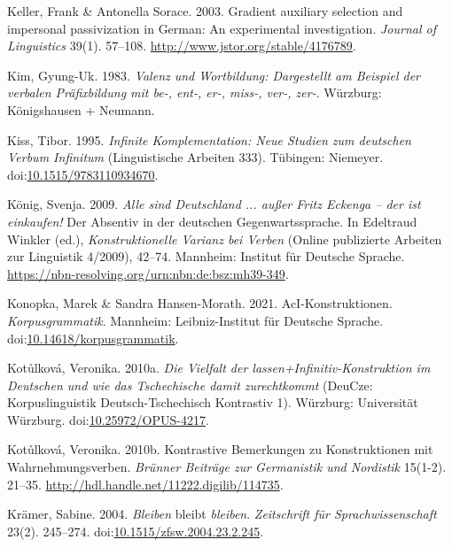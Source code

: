 \leavevmode{}%
Keller, Frank \& Antonella Sorace. 2003. Gradient auxiliary selection
and impersonal passivization in {German}: An experimental investigation.
\emph{Journal of Linguistics} 39(1). 57--108.
\url{http://www.jstor.org/stable/4176789}.

\leavevmode{}%
Kim, Gyung-Uk. 1983. \emph{Valenz und {Wortbildung}: Dargestellt am
{Beispiel} der verbalen {Präfixbildung} mit be-, ent-, er-, miss-, ver-,
zer-}. Würzburg: Königshausen + Neumann.

\leavevmode{}%
Kiss, Tibor. 1995. \emph{Infinite {Komplementation}: Neue {Studien} zum
deutschen {Verbum} {Infinitum}} (Linguistische Arbeiten 333). Tübingen:
Niemeyer.
doi:\href{https://doi.org/10.1515/9783110934670}{10.1515/9783110934670}.

\leavevmode{}%
König, Svenja. 2009. \emph{Alle sind {Deutschland} ... {außer} {Fritz
Eckenga} -- der ist einkaufen!} {Der Absentiv} in der deutschen
{Gegenwartssprache}. In Edeltraud Winkler (ed.), \emph{Konstruktionelle
{Varianz} bei {Verben}} (Online {publizierte} Arbeiten {zur} Linguistik
4/2009), 42--74. Mannheim: Institut für Deutsche Sprache.
\url{https://nbn-resolving.org/urn:nbn:de:bsz:mh39-349}.

\leavevmode{}%
Konopka, Marek \& Sandra Hansen-Morath. 2021. {AcI-Konstruktionen}.
\emph{Korpusgrammatik}. Mannheim: Leibniz-Institut für Deutsche Sprache.
doi:\href{https://doi.org/10.14618/korpusgrammatik}{10.14618/korpusgrammatik}.

\leavevmode{}%
Kotůlková, Veronika. 2010a. \emph{Die {Vielfalt} der
{lassen+Infinitiv-Konstruktion} im {Deutschen} und wie das
{Tschechische} damit zurechtkommt} (DeuCze: Korpuslinguistik
Deutsch-Tschechisch Kontrastiv 1). Würzburg: Universität Würzburg.
doi:\href{https://doi.org/10.25972/OPUS-4217}{10.25972/OPUS-4217}.

\leavevmode{}%
Kotůlková, Veronika. 2010b. Kontrastive {Bemerkungen} zu
{Konstruktionen} mit {Wahrnehmungsverben}. \emph{Brünner Beiträge zur
Germanistik und Nordistik} 15(1-2). 21--35.
\url{http://hdl.handle.net/11222.digilib/114735}.

\leavevmode{}%
Krämer, Sabine. 2004. \emph{Bleiben} bleibt \emph{bleiben}.
\emph{Zeitschrift für Sprachwissenschaft} 23(2). 245--274.
doi:\href{https://doi.org/10.1515/zfsw.2004.23.2.245}{10.1515/zfsw.2004.23.2.245}.

